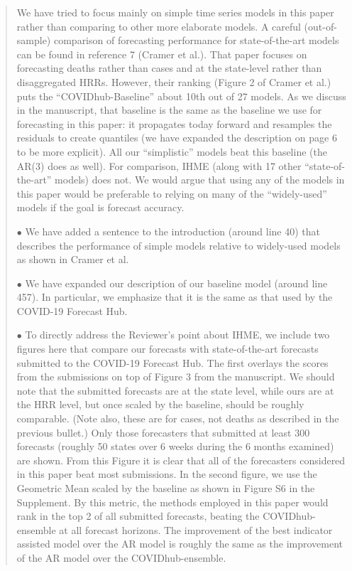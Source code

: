 \documentclass[11pt]{article}
\newenvironment{resp}{\begin{quote}\color{cobalt}}{\end{quote}}
\begin{document}
\begin{resp}
  We have tried to focus mainly on simple time series models in this paper
  rather than comparing to other more elaborate models. A careful
  (out-of-sample) comparison of forecasting performance for state-of-the-art
  models can be found in reference 7 (Cramer et al.). That paper focuses on
  forecasting deaths rather than cases and at the state-level rather than
  disaggregated HRRs. However, their ranking (Figure 2 of Cramer et al.) puts the
  ``COVIDhub-Baseline'' about 10th out of 27 models. As we discuss in the
  manuscript, that baseline is  
  the
  same as the baseline we use for forecasting in this paper: it propagates today
  forward and resamples the residuals to create quantiles (we have expanded the
  description on page 6 to be more explicit). All our ``simplistic'' models beat
  this baseline (the AR(3) does as well). For comparison, IHME (along with 17 other
  ``state-of-the-art'' models) does not. We would argue that using any of the
  models in this paper would be preferable to relying on many of the
  ``widely-used'' models if the goal is forecast accuracy.

  $\bullet$ We have added a sentence to the introduction (around line 40) that
  describes the performance of simple models relative to widely-used models as
  shown in Cramer et al.

  $\bullet$ We have expanded our description of our baseline model (around line
  457). In particular, we emphasize that it is the same as that used by the
  COVID-19 Forecast Hub.

  $\bullet$ To directly address the Reviewer's point about IHME, we include two
  figures here
  that compare our forecasts with state-of-the-art forecasts
  submitted to the COVID-19 Forecast Hub. The first overlays the
  scores from the submissions on top of Figure 3 from the manuscript. We should
  note that the submitted forecasts are at the state level, while ours are at
  the HRR level, but once scaled by the baseline, should be roughly comparable.
  (Note also, these are for cases, not deaths as described in the previous
  bullet.) 
  Only those forecasters that submitted at least 300 forecasts (roughly 50
  states over 6 weeks during the 6 months examined) are shown. From this Figure
  it is clear that all of the forecasters considered in this paper beat most
  submissions. In the second figure, we use the Geometric Mean scaled by the
  baseline as shown in Figure S6 in the Supplement. By this metric, the methods employed in this
  paper would rank in the top 2 of all submitted forecasts, beating the
  COVIDhub-ensemble at all forecast 
  horizons. The improvement of the best indicator assisted model over the AR model
  is roughly the same as the improvement of the AR model over the
  COVIDhub-ensemble.


\end{resp}
\end{document}
